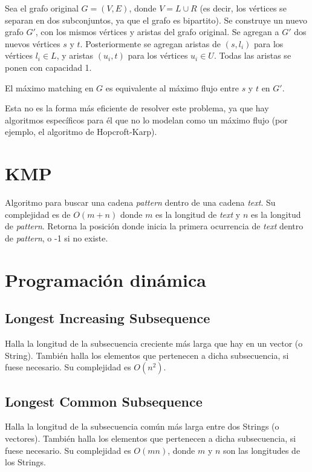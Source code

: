 \documentclass{article}
\begin{document}
\begin{multicols}{2}
	Sea el grafo original \( G = (V, E) \), donde \( V = L \cup R \) (es decir, los vértices se separan en dos subconjuntos, ya que el grafo es bipartito). Se construye un nuevo grafo \( G' \), con los mismos vértices y aristas del grafo original. Se agregan a \( G' \) dos nuevos vértices \( s \) y \( t \). Posteriormente se agregan aristas de \( (s, l_i) \) para los vértices \( l_i  \in L \), y aristas \( (u_i, t) \) para los vértices \( u_i \in U \). Todas las aristas se ponen con capacidad 1.
	
	El máximo matching en \( G \) es equivalente al máximo flujo entre \( s \) y \( t \) en \( G' \).
	
	Esta no es la forma más eficiente de resolver este problema, ya que hay algoritmos específicos para él que no lo modelan como un máximo flujo (por ejemplo, el algoritmo de Hopcroft-Karp).

\section{KMP}
Algoritmo para buscar una cadena \emph{pattern} dentro de una cadena \emph{text}. Su complejidad es de \( O(m+n) \) donde \( m \) es la longitud de \emph{text} y \( n \) es la longitud de \emph{pattern}. Retorna la posición donde inicia la primera ocurrencia de \emph{text} dentro de \emph{pattern}, o -1 si no existe.


\section{Programación dinámica}
	\subsection{Longest Increasing Subsequence}
		Halla la longitud de la subsecuencia creciente más larga que hay en un vector (o String). También halla los elementos que pertenecen a dicha subsecuencia, si fuese necesario. Su complejidad es \( O(n^2) \).
		
		
	\subsection{Longest Common Subsequence}
		Halla la longitud de la subsecuencia común más larga entre dos Strings (o vectores). También halla los elementos que pertenecen a dicha subsecuencia, si fuese necesario. Su complejidad es \( O(mn) \), donde \( m \) y \( n \) son las longitudes de los Strings.
		
	

\end{multicols}
\end{document}
